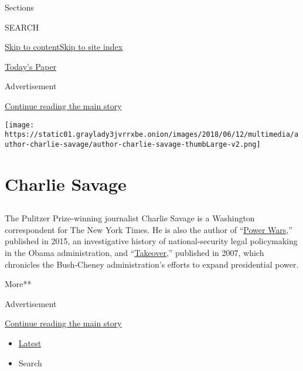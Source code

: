 Sections

SEARCH

\protect\hyperlink{site-content}{Skip to
content}\protect\hyperlink{site-index}{Skip to site index}

\href{https://myaccount.nytimes3xbfgragh.onion/auth/login?response_type=cookie\&client_id=vi}{}

\href{https://www.nytimes3xbfgragh.onion/section/todayspaper}{Today's
Paper}

Advertisement

\protect\hyperlink{after-top}{Continue reading the main story}

\texttt{[image: https://static01.graylady3jvrrxbe.onion/images/2018/06/12/multimedia/author-charlie-savage/author-charlie-savage-thumbLarge-v2.png]}

\hypertarget{charlie-savage}{%
\section{Charlie Savage}\label{charlie-savage}}

\subsection{}

The Pulitzer Prize-winning journalist Charlie Savage is a Washington
correspondent for The New York Times. He is also the author of
``\href{http://www.nytimes3xbfgragh.onion/2015/12/20/books/review/charlie-savages-power-wars.html}{Power
Wars},'' published in 2015, an investigative history of
national-security legal policymaking in the Obama administration, and
``\href{http://www.nytimes3xbfgragh.onion/2007/09/25/books/25kaku.html}{Takeover},''
published in 2007, which chronicles the Bush-Cheney administration's
efforts to expand presidential power.

More**

Advertisement

\protect\hyperlink{after-mid1}{Continue reading the main story}

\begin{itemize}
\tightlist
\item
  \protect\hyperlink{stream-panel}{Latest}
\item
  Search
\end{itemize}

